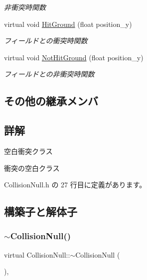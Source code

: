 \begin{DoxyCompactItemize}
\begin{DoxyCompactList}\small\item\em 非衝突時関数 \end{DoxyCompactList}\item 
virtual void \mbox{\hyperlink{class_collision_null_a75900c2cec4e49336701e2e3c64e5bfe}{Hit\+Ground}} (float position\+\_\+y)
\begin{DoxyCompactList}\small\item\em フィールドとの衝突時関数 \end{DoxyCompactList}\item 
virtual void \mbox{\hyperlink{class_collision_null_ad456a03a3e3d55d8d408b7ed28ce7911}{Not\+Hit\+Ground}} (float position\+\_\+y)
\begin{DoxyCompactList}\small\item\em フィールドとの非衝突時関数 \end{DoxyCompactList}\end{DoxyCompactItemize}
\subsection*{その他の継承メンバ}


\subsection{詳解}
空白衝突クラス 

衝突の空白クラス 

 Collision\+Null.\+h の 27 行目に定義があります。



\subsection{構築子と解体子}
\mbox{\label{class_collision_null_a2eaef584b2ae2c4062df8bf3a6533fb3}} 
\subsubsection{\texorpdfstring{$\sim$\+Collision\+Null()}{~CollisionNull()}}
{\footnotesize\ttfamily virtual Collision\+Null\+::$\sim$\+Collision\+Null (\begin{DoxyParamCaption}{ }\end{DoxyParamCaption})\hspace{0.3cm}{\ttfamily [inline]}, {\ttfamily [virtual]}}



